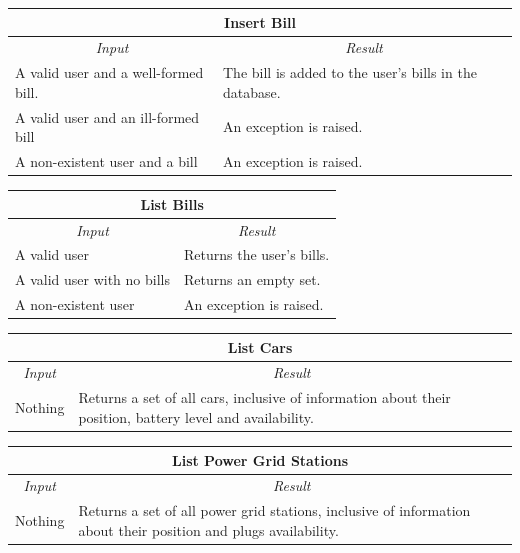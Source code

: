 \documentclass[english]{article}
\begin{document}
\begin{center}
	\begin{tabular}{ | p{6cm} | p{6cm} | }
		\hline 
		\multicolumn{2}{|c|}{\textbf{Insert Bill}} \\
		\hline
		\multicolumn{1}{|c|}{\textit{Input}} & \multicolumn{1}{c|}{\textit{Result}} \\
		\hline
		A valid user and a well-formed bill. & The bill is added to the user's bills in the database. \\
		\hline
		A valid user and an ill-formed bill & An exception is raised. \\
		\hline
		A non-existent user and a bill & An exception is raised. \\
		\hline
	\end{tabular}
\end{center}

\begin{center}
	\begin{tabular}{ | p{6cm} | p{6cm} | }
		\hline
		\multicolumn{2}{|c|}{\textbf{List Bills}} \\
		\hline
		\multicolumn{1}{|c|}{\textit{Input}} & \multicolumn{1}{c|}{\textit{Result}} \\
		\hline
		A valid user & Returns the user's bills. \\
		\hline
		A valid user with no bills & Returns an empty set. \\
		\hline
		A non-existent user & An exception is raised. \\
		\hline
	\end{tabular}
\end{center}

\begin{center}
	\begin{tabular}{ | p{6cm} | p{6cm} | }
		\hline
		\multicolumn{2}{|c|}{\textbf{List Cars}} \\
		\hline
		\multicolumn{1}{|c|}{\textit{Input}} & \multicolumn{1}{c|}{\textit{Result}} \\
		\hline
		Nothing & Returns a set of all cars, inclusive of information about their position, battery level and availability. \\
		\hline
	\end{tabular}
\end{center}

\begin{center}
	\begin{tabular}{ | p{6cm} | p{6cm} | }
		\hline 
		\multicolumn{2}{|c|}{\textbf{List Power Grid Stations}} \\
		\hline
		\multicolumn{1}{|c|}{\textit{Input}} & \multicolumn{1}{c|}{\textit{Result}} \\
		\hline
		Nothing & Returns a set of all power grid stations, inclusive of information about their position and plugs availability. \\
		\hline
	\end{tabular}
\end{center}
\end{document}
